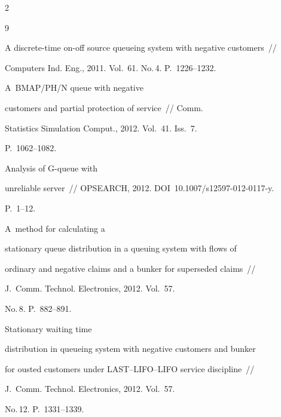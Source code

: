 \begin{multicols}{2}
{{\begin{thebibliography}{9}


 A discrete-time on-off source queueing system with negative customers~// 


Computers Ind. Eng., 2011. Vol.~61. No.\,4. P.~1226--1232.
















 A~BMAP/PH/N queue with negative


customers and partial protection of service~//  Comm.


Statistics Simulation  Comput., 2012. Vol.~41. Iss.~7.


P.~1062--1082.







 Analysis of G-queue with


unreliable server~// OPSEARCH, 2012. DOI~10.1007/s12597-012-0117-y.


P.~1--12.







 A~method for calculating a


stationary queue distribution in a queuing system with flows of


ordinary and negative claims and a bunker for superseded claims~//


J.~Comm. Technol. Electronics, 2012. Vol.~57.


No.\,8. P.~882--891.







 Stationary waiting time


distribution in queueing system with negative customers and bunker


for ousted customers under LAST--LIFO--LIFO service discipline~//


J.~Comm. Technol. Electronics, 2012. Vol.~57.


No.\,12. P.~1331--1339.






\end{thebibliography}}}
\end{multicols}
